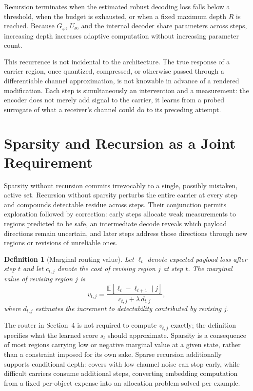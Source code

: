 \documentclass[11pt]{article}
\newtheorem{definition}{Definition}
\begin{document}
Recursion terminates when the estimated robust decoding loss falls below a threshold, when the budget is exhausted, or when a fixed maximum depth $R$ is reached. Because $G_\psi$, $U_\theta$, and the internal decoder share parameters across steps, increasing depth increases adaptive computation without increasing parameter count.

This recurrence is not incidental to the architecture. The true response of a carrier region, once quantized, compressed, or otherwise passed through a differentiable channel approximation, is not knowable in advance of a rendered modification. Each step is simultaneously an intervention and a measurement: the encoder does not merely add signal to the carrier, it learns from a probed surrogate of what a receiver's channel could do to its preceding attempt.

\section{Sparsity and Recursion as a Joint Requirement}

Sparsity without recursion commits irrevocably to a single, possibly mistaken, active set. Recursion without sparsity perturbs the entire carrier at every step and compounds detectable residue across steps. Their conjunction permits exploration followed by correction: early steps allocate weak measurements to regions predicted to be safe, an intermediate decode reveals which payload directions remain uncertain, and later steps address those directions through new regions or revisions of unreliable ones.

\begin{definition}[Marginal routing value]
Let $\ell_t$ denote expected payload loss after step $t$ and let $c_{t,j}$ denote the cost of revising region $j$ at step $t$. The marginal value of revising region $j$ is
\[
v_{t,j} = \frac{\mathbb{E}[\ell_t - \ell_{t+1} \mid j]}{c_{t,j} + \lambda\, d_{t,j}},
\]
where $d_{t,j}$ estimates the increment to detectability contributed by revising $j$.
\end{definition}

The router in Section~4 is not required to compute $v_{t,j}$ exactly; the definition specifies what the learned score $s_t$ should approximate. Sparsity is a consequence of most regions carrying low or negative marginal value at a given state, rather than a constraint imposed for its own sake. Sparse recursion additionally supports conditional depth: covers with low channel noise can stop early, while difficult carriers consume additional steps, converting embedding computation from a fixed per-object expense into an allocation problem solved per example.
\end{document}
